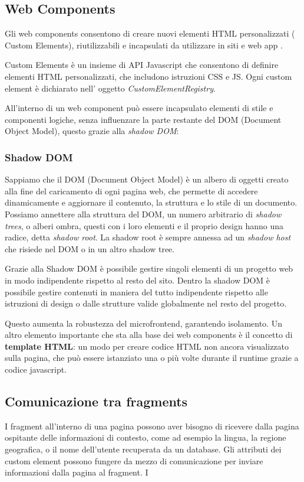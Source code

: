 \subsection*{Web Components}
Gli web components consentono di creare nuovi elementi HTML personalizzati ( Custom Elements), riutilizzabili e incapsulati
da utilizzare in siti e web app \cite{webcomponents}.

Custom Elements è un insieme di API Javascript che consentono di definire elementi HTML personalizzati, che includono istruzioni CSS e JS.
Ogni custom element è dichiarato nell' oggetto \emph{CustomElementRegistry}.
\linebreak

All'interno di un web component può essere incapsulato elementi di stile e componenti logiche, senza influenzare
la parte restante del DOM (Document Object Model), questo grazie alla \emph{shadow DOM}:
\subsubsection*{Shadow DOM}
Sappiamo che il DOM (Document Object Model) è un albero di oggetti creato alla fine del caricamento di ogni pagina web, che 
permette di accedere dinamicamente e aggiornare il contenuto, la struttura e lo stile di un documento.\cite{dom}
Possiamo annettere alla struttura del DOM, un numero arbitrario di \emph{shadow trees}, 
o alberi ombra, questi con i loro elementi e il proprio design hanno una radice, detta  \emph{shadow root}.
La shadow root è sempre annessa ad un \emph{shadow host} che risiede nel DOM o in un altro shadow tree.

Grazie alla Shadow DOM è possibile gestire singoli elementi di un progetto web in modo indipendente rispetto al resto del sito.
Dentro la shadow DOM è possibile gestire contenuti in maniera del tutto indipendente rispetto alle istruzioni di design o dalle strutture
valide globalmente nel resto del progetto.

Questo aumenta la robustezza del microfrontend, garantendo isolamento.
\linebreak
\linebreak
Un altro elemento importante che sta alla base dei web components è il concetto di \textbf{template HTML}: 
un modo per creare codice HTML non ancora visualizzato sulla pagina, che può essere istanziato una o più volte 
durante il runtime grazie a codice javascript.



\subsection*{Comunicazione tra fragments}
I fragment all'interno di una pagina possono aver bisogno di ricevere dalla pagina 
ospitante delle informazioni di contesto, come ad esempio la lingua, 
la regione geografica, o il nome dell'utente recuperata da un database.
Gli attributi dei custom element possono fungere da mezzo di comunicazione per inviare
informazioni dalla pagina al fragment.
I

